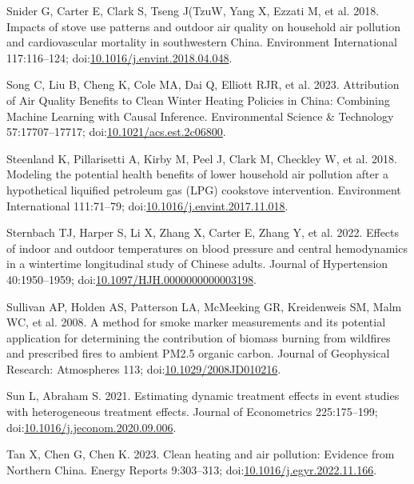 \documentclass[
  letterpaper,
  DIV=11,
  numbers=noendperiod]{scrartcl}
\newlength{\cslhangindent}
\newenvironment{CSLReferences}[2] %
 {\begin{list}{}{%
  \setlength{\itemindent}{0pt}
  \setlength{\leftmargin}{0pt}
  \setlength{\parsep}{0pt}
  \ifodd #1
   \setlength{\leftmargin}{\cslhangindent}
   \setlength{\itemindent}{-1\cslhangindent}
  \fi
  \setlength{\itemsep}{#2\baselineskip}}}
 {\end{list}}
\begin{document}
\begin{CSLReferences}{1}{1}
Snider G, Carter E, Clark S, Tseng J(TzuW, Yang X, Ezzati M, et al.
2018. Impacts of stove use patterns and outdoor air quality on household
air pollution and cardiovascular mortality in southwestern {China}.
Environment International 117:116--124;
doi:\href{https://doi.org/10.1016/j.envint.2018.04.048}{10.1016/j.envint.2018.04.048}.

Song C, Liu B, Cheng K, Cole MA, Dai Q, Elliott RJR, et al. 2023.
Attribution of {Air Quality Benefits} to {Clean Winter Heating Policies}
in {China}: {Combining Machine Learning} with {Causal Inference}.
Environmental Science \& Technology 57:17707--17717;
doi:\href{https://doi.org/10.1021/acs.est.2c06800}{10.1021/acs.est.2c06800}.

Steenland K, Pillarisetti A, Kirby M, Peel J, Clark M, Checkley W, et
al. 2018. Modeling the potential health benefits of lower household air
pollution after a hypothetical liquified petroleum gas ({LPG}) cookstove
intervention. Environment International 111:71--79;
doi:\href{https://doi.org/10.1016/j.envint.2017.11.018}{10.1016/j.envint.2017.11.018}.

Sternbach TJ, Harper S, Li X, Zhang X, Carter E, Zhang Y, et al. 2022.
Effects of indoor and outdoor temperatures on blood pressure and central
hemodynamics in a wintertime longitudinal study of {Chinese} adults.
Journal of Hypertension 40:1950--1959;
doi:\href{https://doi.org/10.1097/HJH.0000000000003198}{10.1097/HJH.0000000000003198}.

Sullivan AP, Holden AS, Patterson LA, McMeeking GR, Kreidenweis SM, Malm
WC, et al. 2008. A method for smoke marker measurements and its
potential application for determining the contribution of biomass
burning from wildfires and prescribed fires to ambient {PM2}.5 organic
carbon. Journal of Geophysical Research: Atmospheres 113;
doi:\href{https://doi.org/10.1029/2008JD010216}{10.1029/2008JD010216}.

Sun L, Abraham S. 2021. Estimating dynamic treatment effects in event
studies with heterogeneous treatment effects. Journal of Econometrics
225:175--199;
doi:\href{https://doi.org/10.1016/j.jeconom.2020.09.006}{10.1016/j.jeconom.2020.09.006}.

Tan X, Chen G, Chen K. 2023. Clean heating and air pollution: {Evidence}
from {Northern China}. Energy Reports 9:303--313;
doi:\href{https://doi.org/10.1016/j.egyr.2022.11.166}{10.1016/j.egyr.2022.11.166}.


\end{CSLReferences}
\end{document}
